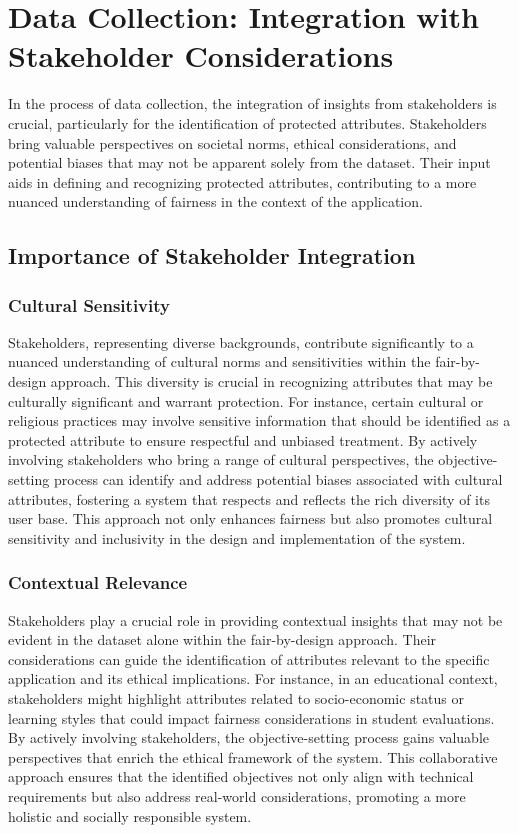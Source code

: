 \documentclass[12pt,a4paper,openright,twoside]{book}
\begin{document}
\section{Data Collection: Integration with Stakeholder Considerations}
\label{section:data-collection}

In the process of data collection, the integration of insights from stakeholders is crucial, particularly for the identification of protected attributes. Stakeholders bring valuable perspectives on societal norms, ethical considerations, and potential biases that may not be apparent solely from the dataset. Their input aids in defining and recognizing protected attributes, contributing to a more nuanced understanding of fairness in the context of the application.

\subsection{Importance of Stakeholder Integration}

\subsubsection{Cultural Sensitivity}


Stakeholders, representing diverse backgrounds, contribute significantly to a nuanced understanding of cultural norms and sensitivities within the fair-by-design approach. This diversity is crucial in recognizing attributes that may be culturally significant and warrant protection. For instance, certain cultural or religious practices may involve sensitive information that should be identified as a protected attribute to ensure respectful and unbiased treatment. By actively involving stakeholders who bring a range of cultural perspectives, the objective-setting process can identify and address potential biases associated with cultural attributes, fostering a system that respects and reflects the rich diversity of its user base. This approach not only enhances fairness but also promotes cultural sensitivity and inclusivity in the design and implementation of the system.

\subsubsection{Contextual Relevance}


Stakeholders play a crucial role in providing contextual insights that may not be evident in the dataset alone within the fair-by-design approach. Their considerations can guide the identification of attributes relevant to the specific application and its ethical implications. For instance, in an educational context, stakeholders might highlight attributes related to socio-economic status or learning styles that could impact fairness considerations in student evaluations. By actively involving stakeholders, the objective-setting process gains valuable perspectives that enrich the ethical framework of the system. This collaborative approach ensures that the identified objectives not only align with technical requirements but also address real-world considerations, promoting a more holistic and socially responsible system.
\end{document}

